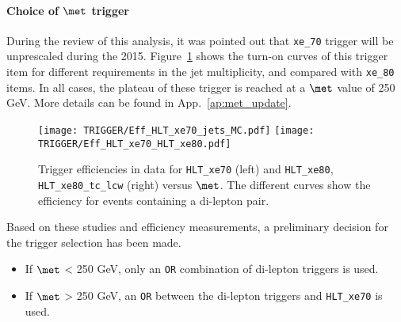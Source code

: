 \paragraph{Choice of $\met$ trigger}

During the review of this analysis, it was pointed out that \texttt{xe\_70} trigger will be unprescaled during the 2015. 
Figure~\ref{fig:triggerEff_xe70_main} shows the turn-on curves of this trigger item for different requirements in the jet multiplicity,
and compared with \texttt{xe\_80} items. In all cases, the plateau of these trigger is reached at a $\met$ value of 250 GeV. More details can be found in App.~\ref{ap:met_update}.

\begin{figure}[htb!]
\centering
\texttt{[image: TRIGGER/Eff\_HLT\_xe70\_jets\_MC.pdf]}
\texttt{[image: TRIGGER/Eff\_HLT\_xe70\_HLT\_xe80.pdf]}
\caption{Trigger efficiencies in data for \texttt{HLT\_xe70} (left) and \texttt{HLT\_xe80}, \texttt{HLT\_xe80\_tc\_lcw} (right) versus $\met$. The different curves show the efficiency for events containing a di-lepton pair.}
 \label{fig:triggerEff_xe70_main}
\end{figure}


Based on these studies and efficiency measurements, a preliminary decision for the trigger selection has been made.

\begin{itemize}

\item If $\met$ < 250 GeV, only an \texttt{OR} combination of di-lepton triggers is used. 

\item If $\met$ > 250 GeV, an \texttt{OR} between the di-lepton triggers and \texttt{HLT\_xe70} is used.

\end{itemize}
